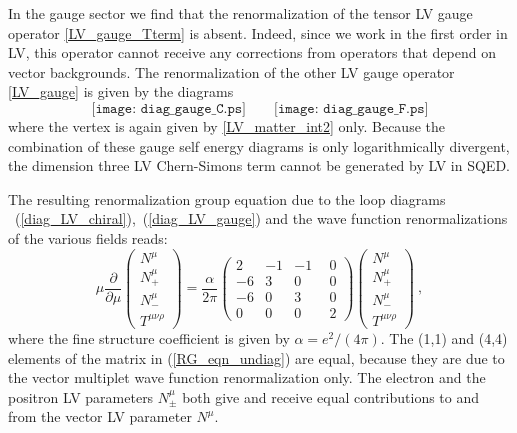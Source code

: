 \documentclass[12pt]{revtex4}
\begin{document}
In the gauge sector we find that the renormalization of the tensor LV
gauge operator \eqref{LV_gauge_Tterm} is absent. 
Indeed, since we work in the first order in
LV, this operator cannot receive any corrections from operators that
depend on vector backgrounds. The renormalization of the other LV
gauge operator \eqref{LV_gauge} is given by the diagrams
\begin{equation} 
\label{diag_LV_gauge}
\texttt{[image: diag\_gauge\_C.ps]} 
\qquad 
\texttt{[image: diag\_gauge\_F.ps]}
\end{equation} 
where the vertex is again given by \eqref{LV_matter_int2}
only. Because the combination of these gauge self energy diagrams is
only logarithmically divergent, the dimension three LV Chern-Simons
term cannot be generated by LV in SQED.   

The resulting renormalization group equation due to the loop diagrams 
~(\ref{diag_LV_chiral}),~(\ref{diag_LV_gauge}) and the wave function
renormalizations of the various fields reads:
\begin{equation}
\label{RG_eqn_undiag}
     \mu \frac{\partial}
              {\partial\mu} 
                \left(
\begin{array}{c}
                   N^\mu \\ 
   N_+^\mu \\
                   N_{-}^\mu \\
   T^{\mu\nu\rho}
                \end{array} \right) = 
     \frac{\alpha}
          {2 \pi} 
     \left(\begin{array}{rrrr}
                    2 & -1 & -1 & ~~0 \\
   -6 &  3 &  0 & ~~0 \\
                   -6 &  0 &  3 & ~~0 \\
    0 &  0 &  0 & ~~2
           \end{array}\right)
     \left(
  \begin{array}{c}
                 N^\mu \\ 
 N_+^\mu \\
                 N_{-}^\mu \\
 T^{\mu\nu\rho}
          \end{array} \right)~,
\end{equation}
where the fine structure coefficient is given by $\alpha =
e^2/(4\pi)$. The (1,1) and (4,4) elements of the matrix in
(\ref{RG_eqn_undiag}) are equal, because they are due to the vector 
multiplet wave function renormalization only. The electron and the
positron LV parameters $N_\pm^\mu$ both give and receive equal
contributions to and from the vector LV parameter $N^\mu$. 
\end{document}
